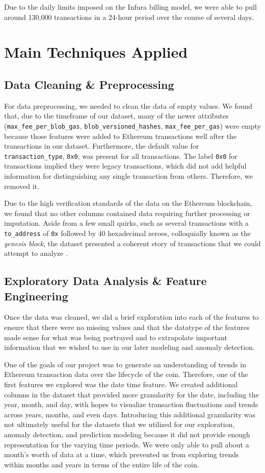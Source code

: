 \documentclass[sigconf]{acmart}
\begin{document}
Due to the daily limits imposed on the Infura billing model, we were able to pull around 130,000 transactions in a 24-hour period over the course of several days.  

\section{Main Techniques Applied}


\subsection{Data Cleaning \& Preprocessing}
For data preprocessing, we needed to clean the data of empty values. We found that, due to the timeframe of our dataset, many of the newer attributes (\texttt{max\_fee\_per\_blob\_gas}, \texttt{blob\_versioned\_hashes}, \texttt{max\_fee\_per\_gas}) were empty because those features were added to Ethereum transactions well after the transactions in our dataset. Furthermore, the default value for \texttt{transaction\_type}, \texttt{0x0}, was present for all transactions. The label \texttt{0x0} for transactions implied they were legacy transactions, which did not add helpful information for distinguishing any single transaction from others. Therefore, we removed it.

Due to the high verification standards of the data on the Ethereum blockchain, we found that no other columns contained data requiring further processing or imputation. Aside from a few small quirks, such as several transactions with a \texttt{to\_address} of \texttt{0x} followed by 40 hexadecimal zeroes, colloquially known as the \textit{genesis block}, the dataset presented a coherent story of transactions that we could attempt to analyze \cite{GenesisBlock}.

\subsection{Exploratory Data Analysis \& Feature Engineering}

Once the data was cleaned, we did a brief exploration into each of the features to ensure that there were no missing values and that the datatype of the features made sense for what was being portrayed and to extrapolate important information that we wished to use in our later modeling and anomaly detection.  

One of the goals of our project was to generate an understanding of trends in Ethereum transaction data over the lifecycle of the coin. Therefore, one of the first features we explored was the date time feature. We created additional columns in the dataset that provided more granularity for the date, including the year, month, and day, with hopes to visualize transaction fluctuations and trends across years, months, and even days. Introducing this additional granularity was not ultimately useful for the datasets that we utilized for our exploration, anomaly detection, and prediction modeling because it did not provide enough representation for the varying time periods. We were only able to pull about a month’s worth of data at a time, which prevented us from exploring trends within months and years in terms of the entire life of the coin.
\end{document}
